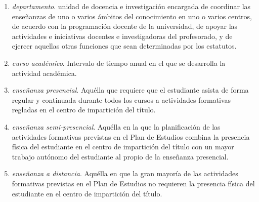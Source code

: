 \begin{enumerate}
\begin{enumerate}
            \item Local o conjunto de locales en que funciona un centro según la acepción \ref{centro_div} (adaptado de la
                RAE\footnote{\url{http://dle.rae.es/?id=HTxyZDZ}}).
        \end{enumerate}

    \item \emph{departamento}. unidad de docencia e investigación encargada de
        coordinar las enseñanzas de uno o varios ámbitos del conocimiento en uno o varios centros,
        de acuerdo con la programación docente de la universidad, de apoyar las actividades e
        iniciativas docentes e investigadoras del profesorado, y de ejercer aquellas otras funciones
        que sean determinadas por los estatutos\cite[artículo 9]{leyUniversidades}.



    \item \emph{curso académico}. Intervalo de tiempo anual en el que se desarrolla la actividad académica. 

    \item \emph{enseñanza presencial}. Aquélla que requiere que el estudiante
        asista de forma regular y continuada durante todos los cursos a
        actividades formativas regladas en el centro de impartición del título\cite[página 10]{guiaMadridMasD}.

    \item \emph{enseñanza semi-presencial}. Aquélla en la que la planificación de las
        actividades formativas previstas en el Plan de Estudios combina la
        presencia física del estudiante en el centro de impartición del título con un
        mayor trabajo autónomo del estudiante al propio de la enseñanza
        presencial\cite[página 10]{guiaMadridMasD}.

    \item \emph{enseñanza a distancia}. Aquélla en que la gran mayoría de las actividades
        formativas previstas en el Plan de Estudios no requieren la presencia física
        del estudiante en el centro de impartición del título\cite[página 10]{guiaMadridMasD}.


\end{enumerate}
